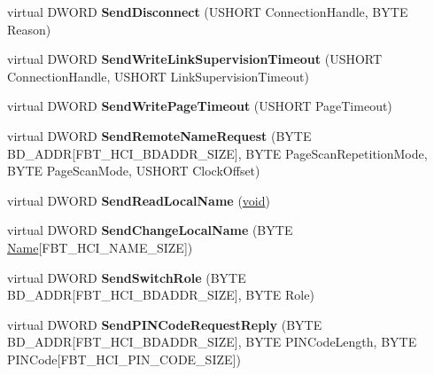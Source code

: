\begin{DoxyCompactItemize}
\item 
\mbox{\label{class_c_hci_a6769ed07d5d38804bee139d5649c95e2}} 
virtual D\+W\+O\+RD {\bfseries Send\+Disconnect} (U\+S\+H\+O\+RT Connection\+Handle, B\+Y\+TE Reason)
\item 
\mbox{\label{class_c_hci_af84ce5aef29ca243f5fb0ee5ebdf7257}} 
virtual D\+W\+O\+RD {\bfseries Send\+Write\+Link\+Supervision\+Timeout} (U\+S\+H\+O\+RT Connection\+Handle, U\+S\+H\+O\+RT Link\+Supervision\+Timeout)
\item 
\mbox{\label{class_c_hci_a1458ac6ef3f865bb625fae37fc23d2e4}} 
virtual D\+W\+O\+RD {\bfseries Send\+Write\+Page\+Timeout} (U\+S\+H\+O\+RT Page\+Timeout)
\item 
\mbox{\label{class_c_hci_a414eac312911df2586d251d293267d66}} 
virtual D\+W\+O\+RD {\bfseries Send\+Remote\+Name\+Request} (B\+Y\+TE B\+D\+\_\+\+A\+D\+DR\mbox{[}F\+B\+T\+\_\+\+H\+C\+I\+\_\+\+B\+D\+A\+D\+D\+R\+\_\+\+S\+I\+ZE\mbox{]}, B\+Y\+TE Page\+Scan\+Repetition\+Mode, B\+Y\+TE Page\+Scan\+Mode, U\+S\+H\+O\+RT Clock\+Offset)
\item 
\mbox{\label{class_c_hci_afd9a81bacbad802b473d2326b5829677}} 
virtual D\+W\+O\+RD {\bfseries Send\+Read\+Local\+Name} (\hyperlink{interfacevoid}{void})
\item 
\mbox{\label{class_c_hci_a01ee5b6409953431a80cb4c14ef87817}} 
virtual D\+W\+O\+RD {\bfseries Send\+Change\+Local\+Name} (B\+Y\+TE \hyperlink{struct_name_rec__}{Name}\mbox{[}F\+B\+T\+\_\+\+H\+C\+I\+\_\+\+N\+A\+M\+E\+\_\+\+S\+I\+ZE\mbox{]})
\item 
\mbox{\label{class_c_hci_afc131196dd7f3ff8ed28eb4c8918b4d0}} 
virtual D\+W\+O\+RD {\bfseries Send\+Switch\+Role} (B\+Y\+TE B\+D\+\_\+\+A\+D\+DR\mbox{[}F\+B\+T\+\_\+\+H\+C\+I\+\_\+\+B\+D\+A\+D\+D\+R\+\_\+\+S\+I\+ZE\mbox{]}, B\+Y\+TE Role)
\item 
\mbox{\label{class_c_hci_acce3363d9ebb8e86069f4c768dd90bc6}} 
virtual D\+W\+O\+RD {\bfseries Send\+P\+I\+N\+Code\+Request\+Reply} (B\+Y\+TE B\+D\+\_\+\+A\+D\+DR\mbox{[}F\+B\+T\+\_\+\+H\+C\+I\+\_\+\+B\+D\+A\+D\+D\+R\+\_\+\+S\+I\+ZE\mbox{]}, B\+Y\+TE P\+I\+N\+Code\+Length, B\+Y\+TE P\+I\+N\+Code\mbox{[}F\+B\+T\+\_\+\+H\+C\+I\+\_\+\+P\+I\+N\+\_\+\+C\+O\+D\+E\+\_\+\+S\+I\+ZE\mbox{]})

\end{DoxyCompactItemize}
